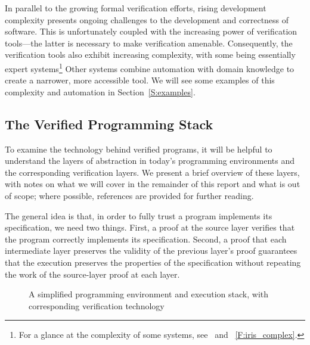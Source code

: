 In parallel to the growing formal verification efforts, rising development
complexity presents ongoing challenges to the development and correctness of
software. This is unfortunately coupled with the increasing power of
verification tools---the latter is necessary to make verification amenable.
Consequently, the verification tools also exhibit increasing complexity, with
some being essentially expert systems\footnote{For a glance at the complexity of
some systems, see~\cite{Jung_2015,Jung_2016,Krebbers_2017a,Jung_2018b} and
\figurename~\ref{F:iris_complex}.} Other systems combine automation with domain
knowledge to create a narrower, more accessible tool. We will see some examples
of this complexity and automation in Section~\ref{S:examples}.

\subsection{The Verified Programming Stack}\label{S:stack}

To examine the technology behind verified programs, it will be helpful to
understand the layers of abstraction in today's programming environments and the
corresponding verification layers. We present a brief overview of these layers,
with notes on what we will cover in the remainder of this report and what is out
of scope; where possible, references are provided for further reading.

The general idea is that, in order to fully trust a program implements its
specification, we need two things. First, a proof at the source layer verifies
that the program correctly implements its specification. Second, a proof that
each intermediate layer preserves the validity of the previous layer's proof
guarantees that the execution preserves the properties of the specification
without repeating the work of the source-layer proof at each layer.

\begin{figure}[ht]
    \centering
    \caption{A simplified programming environment and execution stack, with corresponding verification technology}\label{F:abstraction}
\end{figure}

